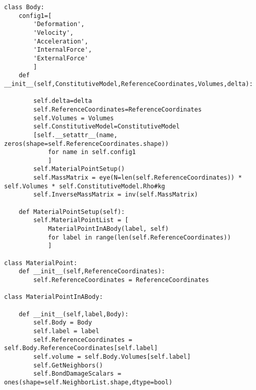 \documentclass[10pt,a4paper,onecolumn]{article}
\begin{document}
\begin{verbatim}
class Body:
    config1=[
        'Deformation',
        'Velocity',
        'Acceleration',
        'InternalForce',
        'ExternalForce'
        ]
    def __init__(self,ConstitutiveModel,ReferenceCoordinates,Volumes,delta):

        self.delta=delta
        self.ReferenceCoordinates=ReferenceCoordinates
        self.Volumes = Volumes
        self.ConstitutiveModel=ConstitutiveModel
        [self.__setattr__(name, zeros(shape=self.ReferenceCoordinates.shape))
            for name in self.config1            
            ]
        self.MaterialPointSetup()
        self.MassMatrix = eye(N=len(self.ReferenceCoordinates)) * self.Volumes * self.ConstitutiveModel.Rho#kg
        self.InverseMassMatrix = inv(self.MassMatrix)
        
    def MaterialPointSetup(self):
        self.MaterialPointList = [
            MaterialPointInABody(label, self)
            for label in range(len(self.ReferenceCoordinates))
            ]

class MaterialPoint:
    def __init__(self,ReferenceCoordinates):
        self.ReferenceCoordinates = ReferenceCoordinates

class MaterialPointInABody:

    def __init__(self,label,Body):
        self.Body = Body
        self.label = label
        self.ReferenceCoordinates = self.Body.ReferenceCoordinates[self.label]
        self.volume = self.Body.Volumes[self.label]
        self.GetNeighbors()
        self.BondDamageScalars = ones(shape=self.NeighborList.shape,dtype=bool)
        

\end{verbatim}
\end{document}
